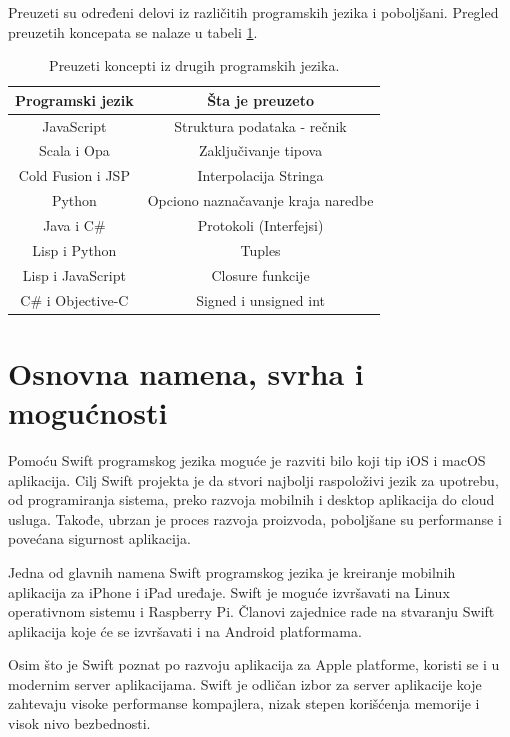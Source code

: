 \documentclass[a4paper]{article}
\begin{document}
 Preuzeti su određeni delovi iz različitih programskih jezika i poboljšani. Pregled preuzetih koncepata se nalaze u tabeli \ref{tab:tabela2}.

\begin{table}[h!]
\begin{center}
\caption{Preuzeti koncepti iz drugih programskih jezika.}
\begin{tabular}{|c|c|} \hline
\label{tab:tabela2}
Programski jezik & Šta je preuzeto \\ \hline
JavaScript & Struktura podataka - rečnik  \\ \hline
Scala i Opa & Zaključivanje tipova \\ \hline
Cold Fusion i JSP & Interpolacija Stringa \\ \hline
Python & Opciono naznačavanje kraja naredbe \\ \hline
Java i C\# & Protokoli (Interfejsi) \\ \hline
Lisp i Python & Tuples \\ \hline
Lisp i JavaScript &  Closure funkcije \\ \hline
C\# i Objective-C & Signed i unsigned int \\ \hline
\end{tabular}
\end{center}
\end{table}

\section{Osnovna namena, svrha i mogućnosti}	
\label{sec:drugiDeo}


Pomoću Swift programskog jezika moguće je razviti bilo koji tip iOS i macOS aplikacija. Cilj Swift projekta je da stvori najbolji raspoloživi jezik za upotrebu, od programiranja sistema, preko razvoja mobilnih i desktop aplikacija do cloud usluga. Takođe, ubrzan je proces razvoja proizvoda, poboljšane su performanse i povećana sigurnost aplikacija.

Jedna od glavnih namena Swift programskog jezika je kreiranje mobilnih aplikacija za iPhone i iPad uređaje. Swift je moguće izvršavati na Linux operativnom sistemu i Raspberry Pi. Članovi zajednice rade na stvaranju Swift aplikacija koje će se izvršavati i na Android platformama.

Osim što je Swift poznat po razvoju aplikacija za Apple platforme, koristi se i u modernim server aplikacijama. Swift je odličan izbor za server aplikacije koje zahtevaju visoke performanse kompajlera, nizak stepen korišćenja memorije i visok nivo bezbednosti.
\end{document}
